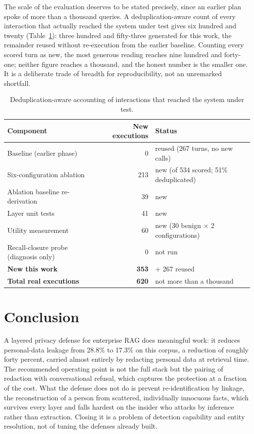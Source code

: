 \documentclass[11pt,a4paper]{article}
\begin{document}
The scale of the evaluation deserves to be stated precisely, since an earlier plan spoke of more than a
thousand queries. A deduplication-aware count of every interaction that actually reached the system
under test gives six hundred and twenty (Table~\ref{tab:scale}): three hundred and fifty-three generated
for this work, the remainder reused without re-execution from the earlier baseline. Counting every
scored turn as new, the most generous reading reaches nine hundred and forty-one; neither figure reaches
a thousand, and the honest number is the smaller one. It is a deliberate trade of breadth for
reproducibility, not an unremarked shortfall.

\begin{table}[h]
\centering
\caption{Deduplication-aware accounting of interactions that reached the system under test.}
\label{tab:scale}
\begin{tabularx}{\textwidth}{@{}l r X@{}}
\toprule
\textbf{Component} & \textbf{New executions} & \textbf{Status}\\
\midrule
Baseline (earlier phase) & 0 & reused (267 turns, no new calls)\\
Six-configuration ablation & 213 & new (of 534 scored; 51\% deduplicated)\\
Ablation baseline re-derivation & 39 & new\\
Layer unit tests & 41 & new\\
Utility measurement & 60 & new (30 benign $\times$ 2 configurations)\\
Recall-closure probe (diagnosis only) & 0 & not run\\
\midrule
\textbf{New this work} & \textbf{353} & + 267 reused\\
\textbf{Total real executions} & \textbf{620} & not more than a thousand\\
\bottomrule
\end{tabularx}
\end{table}

\section{Conclusion}

A layered privacy defense for enterprise RAG does meaningful work: it reduces personal-data leakage from
28.8\% to 17.3\% on this corpus, a reduction of roughly forty percent, carried almost entirely by
redacting personal data at retrieval time. The recommended operating point is not the full stack but the
pairing of redaction with conversational refusal, which captures the protection at a fraction of the
cost. What the defense does not do is prevent re-identification by linkage, the reconstruction of a
person from scattered, individually innocuous facts, which survives every layer and falls hardest on the
insider who attacks by inference rather than extraction. Closing it is a problem of detection capability
and entity resolution, not of tuning the defenses already built.
\end{document}
